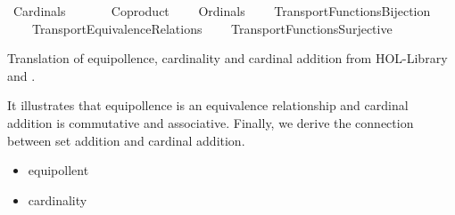 %
\begin{isabellebody}%
%
%
\isadelimtheory
%
\endisadelimtheory
%
\isatagtheory
{}\isamarkupfalse%
\ Cardinals\isanewline
\ \ \isanewline
\ \ \ \ Coproduct\isanewline
\ \ \ \ Ordinals\isanewline
\ \ \ \ Transport{\isachardot}{\kern0pt}Functions{\isacharunderscore}{\kern0pt}Bijection\isanewline
\ \ \ \ Transport{\isachardot}{\kern0pt}Equivalence{\isacharunderscore}{\kern0pt}Relations\isanewline
\ \ \ \ Transport{\isachardot}{\kern0pt}Functions{\isacharunderscore}{\kern0pt}Surjective\isanewline
{}%
\endisatagtheory
{\isafoldtheory}%
%
\isadelimtheory
%
\endisadelimtheory
%
\isadelimdocument
%
\endisadelimdocument
%
\isatagdocument
%
\isamarkuptrue%
%
\endisatagdocument
{\isafolddocument}%
%
\isadelimdocument
%
\endisadelimdocument
%
\begin{isamarkuptext}%
Translation of equipollence, cardinality and cardinal addition 
from HOL-Library and \cite{ZFC_in_HOL_AFP}.

It illustrates that equipollence is an equivalence relationship and
cardinal addition is commutative and associative. Finally, we derive
the connection between set addition and cardinal addition.%
\end{isamarkuptext}\isamarkuptrue%
%
\isadelimdocument
%
\endisadelimdocument
%
\isatagdocument
%
\isamarkuptrue%
%
\endisatagdocument
{\isafolddocument}%
%
\isadelimdocument
%
\endisadelimdocument
%
\begin{isamarkuptext}%
%
\begin{itemize}%
\item equipollent

\item cardinality


\end{itemize}
\end{isamarkuptext}
\end{isabellebody}
